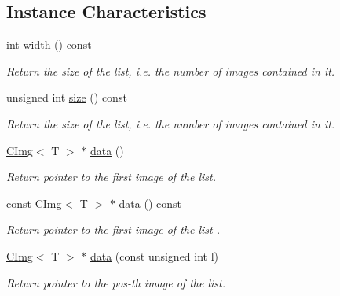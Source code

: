 \subsection*{Instance Characteristics}
\begin{DoxyCompactItemize}
\item 
int \hyperlink{structcimg__library__suffixed_1_1CImgList_a60d81967a11f946a46ab28f2f14109f7}{width} () const
\begin{DoxyCompactList}\small\item\em Return the size of the list, i.\+e. the number of images contained in it. \end{DoxyCompactList}\item 
unsigned int \hyperlink{structcimg__library__suffixed_1_1CImgList_aee903f446b109a60b1107be84f31b01e}{size} () const
\begin{DoxyCompactList}\small\item\em Return the size of the list, i.\+e. the number of images contained in it. \end{DoxyCompactList}\item 
\hyperlink{structcimg__library__suffixed_1_1CImg}{C\+Img}$<$ T $>$ $\ast$ \hyperlink{structcimg__library__suffixed_1_1CImgList_a7824337c659534a3412e5e2373aec595}{data} ()
\begin{DoxyCompactList}\small\item\em Return pointer to the first image of the list. \end{DoxyCompactList}\item 
\mbox{\label{structcimg__library__suffixed_1_1CImgList_aecd41dd27648c80d5558e3af2348a322}} 
const \hyperlink{structcimg__library__suffixed_1_1CImg}{C\+Img}$<$ T $>$ $\ast$ \hyperlink{structcimg__library__suffixed_1_1CImgList_aecd41dd27648c80d5558e3af2348a322}{data} () const
\begin{DoxyCompactList}\small\item\em Return pointer to the first image of the list . \end{DoxyCompactList}\item 
\hyperlink{structcimg__library__suffixed_1_1CImg}{C\+Img}$<$ T $>$ $\ast$ \hyperlink{structcimg__library__suffixed_1_1CImgList_a4f396c99fce9bd1ec9c756da06ee5f60}{data} (const unsigned int l)
\begin{DoxyCompactList}\small\item\em Return pointer to the pos-\/th image of the list. \end{DoxyCompactList}\item 

\end{DoxyCompactItemize}
